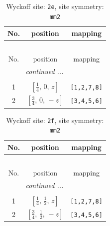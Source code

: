 \documentclass[fleqn,8pt]{jsarticle}
\begin{document}
\begin{longtable}{ccc}
\caption{Wyckoff site: {\tt 2e}, site symmetry: {\tt mm2}}
 \\
 \hline \hline
No. & position & mapping \\ \hline \endfirsthead

\multicolumn{2}{l}{\tablename\ \thetable{}} \\
 \hline \hline
No. & position & mapping \\ \hline \endhead

 \hline \hline
\multicolumn{2}{r}{\footnotesize\it continued ...} \\ \endfoot

 \hline \hline
\multicolumn{2}{r}{} \\ \endlastfoot

1 & $\left[ \frac{1}{4},\, 0,\, z \right]$ & {\tt [1,2,7,8]} \\ \hline
2 & $\left[ \frac{3}{4},\, 0,\, - z \right]$ & {\tt [3,4,5,6]} \\
\end{longtable}
\renewcommand{\arraystretch}{1.2}
\begin{longtable}{ccc}
\caption{Wyckoff site: {\tt 2f}, site symmetry: {\tt mm2}}
 \\
 \hline \hline
No. & position & mapping \\ \hline \endfirsthead

\multicolumn{2}{l}{\tablename\ \thetable{}} \\
 \hline \hline
No. & position & mapping \\ \hline \endhead

 \hline \hline
\multicolumn{2}{r}{\footnotesize\it continued ...} \\ \endfoot

 \hline \hline
\multicolumn{2}{r}{} \\ \endlastfoot

1 & $\left[ \frac{1}{4},\, \frac{1}{2},\, z \right]$ & {\tt [1,2,7,8]} \\ \hline
2 & $\left[ \frac{3}{4},\, \frac{1}{2},\, - z \right]$ & {\tt [3,4,5,6]} \\
\end{longtable}
\renewcommand{\arraystretch}{1.2}
\end{document}

